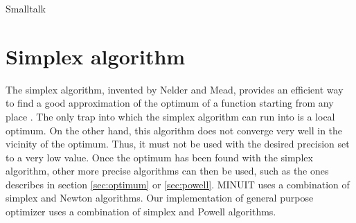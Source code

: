 \begin{displaycode}{Smalltalk}
\section{Simplex algorithm}
\label{sec:simplex} The simplex algorithm, invented by Nelder and
Mead, provides an efficient way to find a good approximation of
the optimum of a function starting from any place \cite{Press}.
The only trap into which the simplex algorithm can run into is a
local optimum. On the other hand, this algorithm does not converge
very well in the vicinity of the optimum. Thus, it must not be
used with the desired precision set to a very low value. Once the
optimum has been found with the simplex algorithm, other more
precise algorithms can then be used, such as the ones describes in
section \ref{sec:optimum} or \ref{sec:powell}. MINUIT uses a
combination of simplex and Newton algorithms. Our implementation
of general purpose optimizer uses a combination of simplex and
Powell algorithms.


\end{displaycode}
